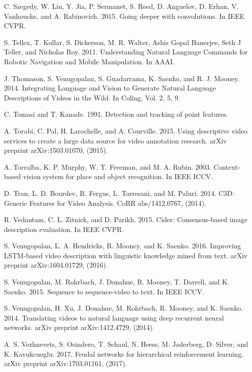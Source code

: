 \documentclass[10pt,journal,compsoc]{IEEEtran}
\begin{document}
\begin{thebibliography}{1}
C. Szegedy, W. Liu, Y. Jia, P. Sermanet, S. Reed, D. Anguelov, D. Erhan, V. Vanhoucke, and A. Rabinovich. 2015. Going deeper with convolutions. In IEEE CVPR.

S. Tellex, T. Kollar, S. Dickerson, M. R. Walter, Ashis Gopal Banerjee, Seth J Teller, and Nicholas Roy. 2011. Understanding Natural Language Commands for Robotic Navigation and Mobile Manipulation. In AAAI.

J. Thomason, S. Venugopalan, S. Guadarrama, K. Saenko, and R. J. Mooney. 2014. Integrating Language and Vision to Generate Natural Language Descriptions of Videos in the Wild. In Coling, Vol. 2, 5, 9.

C. Tomasi and T. Kanade. 1991. Detection and tracking of point features.

A. Torabi, C. Pal, H. Larochelle, and A. Courville. 2015. Using descriptive video services to create a large data source for video annotation research. arXiv preprint arXiv:1503.01070, (2015).

A. Torralba, K. P. Murphy, W. T. Freeman, and M. A. Rubin. 2003. Context-based vision system for
place and object recognition. In IEEE ICCV.

D. Tran, L. D. Bourdev, R. Fergus, L. Torresani, and M. Paluri. 2014. C3D: Generic Features for Video Analysis. CoRR abs/1412.0767, (2014).

R. Vedantam, C. L. Zitnick, and D. Parikh. 2015. Cider: Consensus-based image description
evaluation. In IEEE CVPR.

S. Venugopalan, L. A. Hendricks, R. Mooney, and K. Saenko. 2016. Improving LSTM-based
video description with linguistic knowledge mined from text. arXiv preprint arXiv:1604.01729, (2016).

S. Venugopalan, M. Rohrbach, J. Donahue, R. Mooney, T. Darrell, and K. Saenko. 2015. Sequence to sequence-video to text. In IEEE ICCV.

S. Venugopalan, H. Xu, J. Donahue, M. Rohrbach, R. Mooney, and K. Saenko. 2014. Translating videos to natural language using deep recurrent neural networks. arXiv preprint arXiv:1412.4729, (2014).

A. S. Vezhnevets, S. Osindero, T. Schaul, N. Heess, M. Jaderberg, D. Silver, and K. Kavukcuoglu. 2017. Feudal networks for hierarchical reinforcement learning. arXiv preprint arXiv:1703.01161, (2017).


\end{thebibliography}
\end{document}
